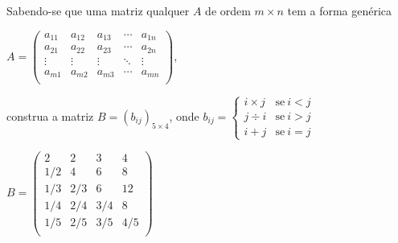 \documentclass[pdftex, brazil, 12pt, oneside, addpoints]{exam}
\begin{document}
\begin{questions}
\ifprintanswers
\newpage
\else
\newpage
\fi

\question
Sabendo-se que uma matriz qualquer $A$ de ordem $m \times n$ tem a forma
genérica

$A = \begin{pmatrix}
  a_{11} & a_{12} & a_{13} & \cdots & a_{1n}\\
  a_{21} & a_{22} & a_{23} & \cdots & a_{2n}\\
  \vdots & \vdots & \vdots & \ddots & \vdots\\
  a_{m1} & a_{m2} & a_{m3} & \cdots & a_{mn}\\
\end{pmatrix}$,

construa a matriz $B = (b_{ij})_{5 \times 4}$, onde
$b_{ij} =
    \begin{cases}
      i \times j & \text{se}\ i < j\\
      j \div i   & \text{se}\ i > j\\
      i + j      & \text{se}\ i = j
    \end{cases}
$
\begin{solutionorbox}[1.5in]
$B = \begin{pmatrix}
   2    & 2    & 3    & 4\\
   1/2  & 4    & 6    & 8\\
   1/3  & 2/3  & 6    & 12\\
   1/4  & 2/4  & 3/4  & 8\\
   1/5  & 2/5  & 3/5  & 4/5\\
\end{pmatrix}$
\end{solutionorbox}




\end{questions}
\end{document}
